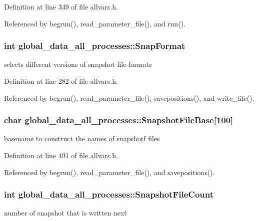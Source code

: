 Definition at line 349 of file allvars.h.



Referenced by begrun(), read\_\-parameter\_\-file(), and run().

\hypertarget{structglobal__data__all__processes_a6e7d07e68bd6242059d1adac6dabf0d1}{
\subsubsection[{SnapFormat}]{\setlength{\rightskip}{0pt plus 5cm}int {\bf global\_\-data\_\-all\_\-processes::SnapFormat}}}
\label{structglobal__data__all__processes_a6e7d07e68bd6242059d1adac6dabf0d1}
selects different versions of snapshot file-\/formats 

Definition at line 282 of file allvars.h.



Referenced by begrun(), read\_\-parameter\_\-file(), savepositions(), and write\_\-file().

\hypertarget{structglobal__data__all__processes_a4bcf5b5c31545691038015af9ae9acb3}{
\subsubsection[{SnapshotFileBase}]{\setlength{\rightskip}{0pt plus 5cm}char {\bf global\_\-data\_\-all\_\-processes::SnapshotFileBase}\mbox{[}100\mbox{]}}}
\label{structglobal__data__all__processes_a4bcf5b5c31545691038015af9ae9acb3}
basename to construct the names of snapshotf files 

Definition at line 491 of file allvars.h.



Referenced by begrun(), read\_\-parameter\_\-file(), and savepositions().

\hypertarget{structglobal__data__all__processes_aac0d3fcbac688a31e6bda55ef819c44b}{
\subsubsection[{SnapshotFileCount}]{\setlength{\rightskip}{0pt plus 5cm}int {\bf global\_\-data\_\-all\_\-processes::SnapshotFileCount}}}
\label{structglobal__data__all__processes_aac0d3fcbac688a31e6bda55ef819c44b}
number of snapshot that is written next 

